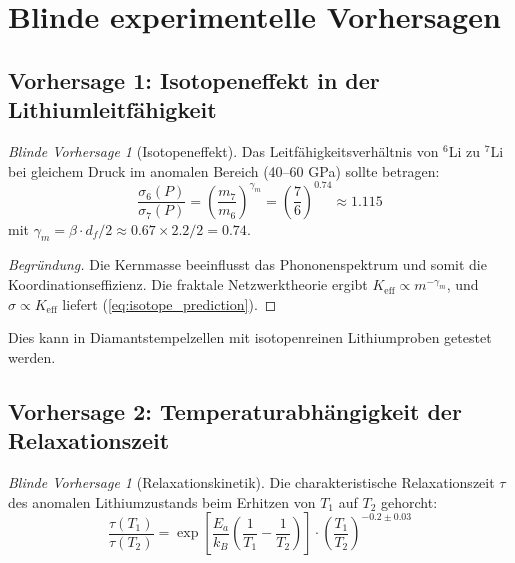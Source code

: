 \documentclass[12pt,a4paper]{article}
\theoremstyle{remark}
\newtheorem{prediction}[theorem]{Blinde Vorhersage}
\newcommand{\Ke}{K_{\mathrm{eff}}}
\newcommand{\df}{d_{\!f}}
\begin{document}
	\section{Blinde experimentelle Vorhersagen}
	
	\subsection{Vorhersage 1: Isotopeneffekt in der Lithiumleitfähigkeit}
	
	\begin{prediction}[Isotopeneffekt]
		Das Leitfähigkeitsverhältnis von \(^6\)Li zu \(^7\)Li bei gleichem Druck im anomalen Bereich (40–60 GPa) sollte betragen:
		\begin{equation}
			\frac{\sigma_6(P)}{\sigma_7(P)} = \left( \frac{m_7}{m_6} \right)^{\gamma_m} = \left( \frac{7}{6} \right)^{0.74} \approx 1.115
			\label{eq:isotope_prediction}
		\end{equation}
		mit \(\gamma_m = \beta \cdot \df / 2 \approx 0.67 \times 2.2 / 2 = 0.74\).
		\label{pred:isotope}
	\end{prediction}
	
	\begin{proof}[Begründung]
		Die Kernmasse beeinflusst das Phononenspektrum und somit die Koordinationseffizienz. Die fraktale Netzwerktheorie ergibt \(\Ke \propto m^{-\gamma_m}\), und \(\sigma \propto \Ke\) liefert (\ref{eq:isotope_prediction}).
	\end{proof}
	
	Dies kann in Diamantstempelzellen mit isotopenreinen Lithiumproben getestet werden.
	
	\subsection{Vorhersage 2: Temperaturabhängigkeit der Relaxationszeit}
	
	\begin{prediction}[Relaxationskinetik]
		Die charakteristische Relaxationszeit \(\tau\) des anomalen Lithiumzustands beim Erhitzen von \(T_1\) auf \(T_2\) gehorcht:
		\begin{equation}
			\frac{\tau(T_1)}{\tau(T_2)} = \exp\left[ \frac{E_a}{k_B} \left( \frac{1}{T_1} - \frac{1}{T_2} \right) \right] \cdot \left( \frac{T_1}{T_2} \right)^{-0.2 \pm 0.03}
			\label{eq:relaxation_prediction}
		\end{equation}
		\label{pred:relaxation}
	\end{prediction}
	
\end{document}
